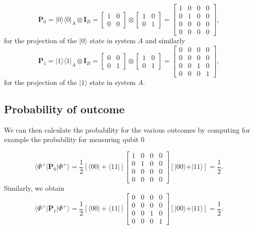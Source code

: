 \documentclass[%
oneside,                 %
final,                   %
10pt]{article}
\begin{document}
\[
\bm{P}_0=\vert 0\rangle\langle 0\vert_A\otimes \bm{I}_B=\begin{bmatrix} 1 & 0\\ 0 & 0\end{bmatrix}\otimes\begin{bmatrix} 1& 0 \\ 0 & 1\end{bmatrix}=\begin{bmatrix} 1 & 0 & 0 & 0 \\ 0 & 1 & 0 & 0 \\ 0 & 0 & 0 & 0 \\ 0 & 0 & 0 & 0\end{bmatrix},
\]
for the projection of the $\vert 0 \rangle$ state in system $A$ and similarly
\[
\bm{P}_1=\vert 1\rangle\langle 1\vert_A\otimes \bm{I}_B=\begin{bmatrix} 0 & 0\\ 0 & 1\end{bmatrix}\otimes\begin{bmatrix} 1& 0 \\ 0 & 1\end{bmatrix}=\begin{bmatrix} 0 & 0 & 0 & 0 \\ 0 & 0 & 0 & 0 \\ 0 & 0 & 1 & 0 \\ 0 & 0 & 0 & 1\end{bmatrix},
\]
for the projection of the $\vert 1 \rangle$ state in system $A$.

\subsection{Probability of  outcome}

We can then calculate the probability for the various outcomes by
computing for example the probability for measuring qubit $0$ 

\[
\langle \Phi^+\vert \bm{P}_0\vert \Phi^+\rangle = \frac{1}{2} \left[\langle 00\vert +\langle 11\vert\right]\begin{bmatrix} 1 & 0 & 0 & 0 \\ 0 & 1 & 0 & 0 \\ 0 & 0 & 0 & 0 \\ 0 & 0 & 0 & 0\end{bmatrix}\left[\vert 00\rangle +\vert 11\rangle\right]=\frac{1}{2}.
\]
Similarly, we obtain
\[
\langle \Phi^+\vert \bm{P}_1\vert \Phi^+\rangle = \frac{1}{2}\left[\langle 00\vert +\langle 11\vert\right]\begin{bmatrix} 0 & 0 & 0 & 0 \\ 0 & 0 & 0 & 0 \\ 0 & 0 & 1 & 0 \\ 0 & 0 & 0 & 1\end{bmatrix}\left[\vert 00\rangle +\vert 11\rangle\right]=\frac{1}{2}.
\]
\end{document}
